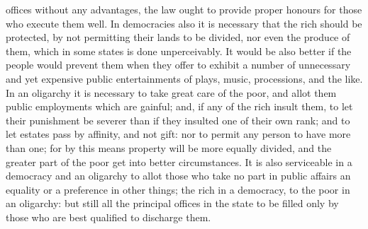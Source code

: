 offices without any advantages, the law ought to provide proper honours
for those who execute them well. In democracies also it is necessary that
the rich should be protected, by not permitting their lands to be divided,
nor even the produce of them, which in some states is done unperceivably.
It would be also better if the people would prevent them when they offer
to exhibit a number of unnecessary and yet expensive public entertainments
of plays, music, processions, and the like. In an oligarchy it is
necessary to take great care of the poor, and allot them public
employments which are gainful; and, if any of the rich insult them, to let
their punishment be severer than if they insulted one of their own rank;
and to let estates pass by affinity, and not gift: nor to permit any
person to have more than one; for by this means property will be more
equally divided, and the greater part of the poor get into better
circumstances. It is also serviceable in a democracy and an oligarchy to
allot those who take no part in public affairs an equality or a preference
in other things; the rich in a democracy, to the poor in an oligarchy: but
still all the principal offices in the state to be filled only by those
who are best qualified to discharge them.


